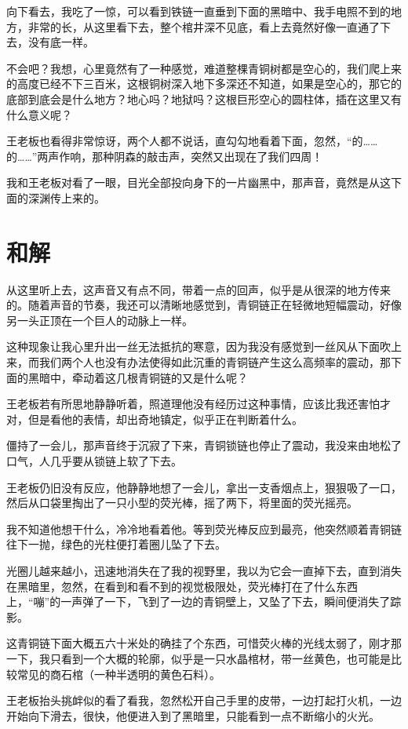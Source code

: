 向下看去，我吃了一惊，可以看到铁链一直垂到下面的黑暗中、我手电照不到的地方，非常的长，从这里看下去，整个棺井深不见底，看上去竟然好像一直通了下去，没有底一样。

不会吧？我想，心里竟然有了一种感觉，难道整棵青铜树都是空心的，我们爬上来的高度已经不下三百米，这根铜树深入地下多深还不知道，如果是空心的，那它的底部到底会是什么地方？地心吗？地狱吗？这根巨形空心的圆柱体，插在这里又有什么意义呢？

王老板也看得非常惊讶，两个人都不说话，直勾勾地看着下面，忽然，“的……的……”两声作响，那种阴森的敲击声，突然又出现在了我们四周！

我和王老板对看了一眼，目光全部投向身下的一片幽黑中，那声音，竟然是从这下面的深渊传上来的。

\chapter{和解}

从这里听上去，这声音又有点不同，带着一点的回声，似乎是从很深的地方传来的。随着声音的节奏，我还可以清晰地感觉到，青铜链正在轻微地短幅震动，好像另一头正顶在一个巨人的动脉上一样。

这种现象让我心里升出一丝无法抵抗的寒意，因为我没有感觉到一丝风从下面吹上来，而我们两个人也没有办法使得如此沉重的青铜链产生这么高频率的震动，那下面的黑暗中，牵动着这几根青铜链的又是什么呢？

王老板若有所思地静静听着，照道理他没有经历过这种事情，应该比我还害怕才对，但是看他的表情，却出奇地镇定，似乎正在判断着什么。

僵持了一会儿，那声音终于沉寂了下来，青铜锁链也停止了震动，我没来由地松了口气，人几乎要从锁链上软了下去。

王老板仍旧没有反应，他静静地想了一会儿，拿出一支香烟点上，狠狠吸了一口，然后从口袋里掏出了一只小型的荧光棒，摇了两下，将里面的荧光摇亮。

我不知道他想干什么，冷冷地看着他。等到荧光棒反应到最亮，他突然顺着青铜链往下一抛，绿色的光柱便打着圈儿坠了下去。

光圈儿越来越小，迅速地消失在了我的视野里，我以为它会一直掉下去，直到消失在黑暗里，忽然，在看到和看不到的视觉极限处，荧光棒打在了什么东西上，“嘣”的一声弹了一下，飞到了一边的青铜壁上，又坠了下去，瞬间便消失了踪影。

这青铜链下面大概五六十米处的确挂了个东西，可惜荧火棒的光线太弱了，刚才那一下，我只看到一个大概的轮廓，似乎是一只水晶棺材，带一丝黄色，也可能是比较常见的商石棺（一种半透明的黄色石料）。

王老板抬头挑衅似的看了看我，忽然松开自己手里的皮带，一边打起打火机，一边开始向下滑去，很快，他便进入到了黑暗里，只能看到一点不断缩小的火光。

